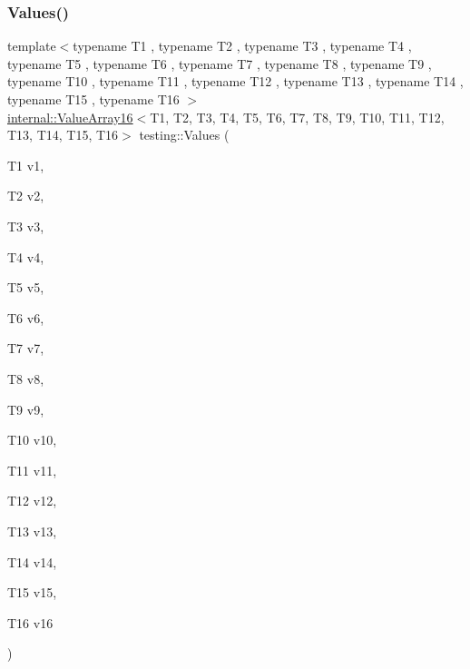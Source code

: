 \subsubsection{\texorpdfstring{Values()}{Values()}\hspace{0.1cm}{\footnotesize\ttfamily [16/50]}}
{\footnotesize\ttfamily template$<$typename T1 , typename T2 , typename T3 , typename T4 , typename T5 , typename T6 , typename T7 , typename T8 , typename T9 , typename T10 , typename T11 , typename T12 , typename T13 , typename T14 , typename T15 , typename T16 $>$ \\
\mbox{\hyperlink{classtesting_1_1internal_1_1ValueArray16}{internal\+::\+Value\+Array16}}$<$T1, T2, T3, T4, T5, T6, T7, T8, T9, T10, T11, T12, T13, T14, T15, T16$>$ testing\+::\+Values (\begin{DoxyParamCaption}\item[{T1}]{v1,  }\item[{T2}]{v2,  }\item[{T3}]{v3,  }\item[{T4}]{v4,  }\item[{T5}]{v5,  }\item[{T6}]{v6,  }\item[{T7}]{v7,  }\item[{T8}]{v8,  }\item[{T9}]{v9,  }\item[{T10}]{v10,  }\item[{T11}]{v11,  }\item[{T12}]{v12,  }\item[{T13}]{v13,  }\item[{T14}]{v14,  }\item[{T15}]{v15,  }\item[{T16}]{v16 }\end{DoxyParamCaption})}

\mbox{\label{namespacetesting_a5cb89ee5c491cbe65de523f9f1bc1987}} 
